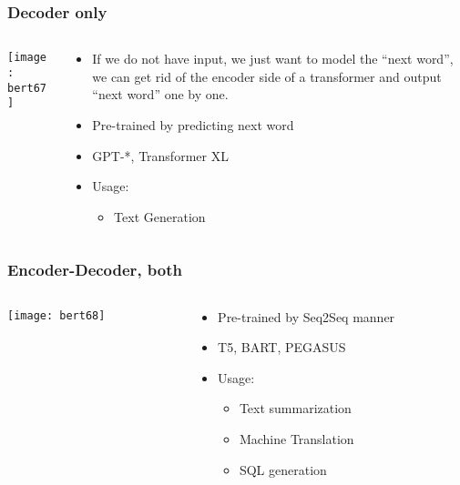 \begin{frame}[fragile]\frametitle{Decoder only}

\begin{columns}
    \begin{column}[T]{0.5\linewidth}
			\begin{center}
			\texttt{[image: bert67]}
			\end{center}		
		\end{column}
    \begin{column}[T]{0.5\linewidth}
      \begin{itemize}
			\item If we do not have input, we just want to model the “next word”, we can get rid of the encoder side of a transformer and output “next word” one by one. 
			\item Pre-trained by predicting next word
			\item GPT-*, Transformer XL
			\item Usage:
      \begin{itemize}
			\item Text Generation
			\end{itemize}
			\end{itemize}
    \end{column}
  \end{columns}
			
\end{frame}


\begin{frame}[fragile]\frametitle{Encoder-Decoder, both}

\begin{columns}
    \begin{column}[T]{0.5\linewidth}
			\begin{center}
			\texttt{[image: bert68]}
			\end{center}		
		\end{column}
    \begin{column}[T]{0.5\linewidth}
      \begin{itemize}
			\item Pre-trained by Seq2Seq manner
			\item T5, BART, PEGASUS
			\item Usage:
      \begin{itemize}
			\item Text summarization
			\item Machine Translation
			\item SQL generation
			\end{itemize}
			\end{itemize}
    \end{column}
  \end{columns}
			
\end{frame}

